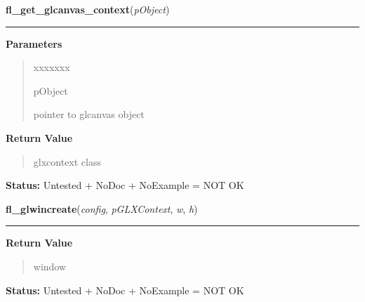\hspace{.8\funcindent}\begin{boxedminipage}{\funcwidth}

    \raggedright \textbf{fl\_get\_glcanvas\_context}(\textit{pObject})

    \vspace{-1.5ex}

    \rule{\textwidth}{0.5\fboxrule}
\setlength{\parskip}{2ex}
\setlength{\parskip}{1ex}
      \textbf{Parameters}
      \vspace{-1ex}

      \begin{quote}
        \begin{Ventry}{xxxxxxx}

          \item[pObject]

          pointer to glcanvas object

        \end{Ventry}

      \end{quote}

      \textbf{Return Value}
    \vspace{-1ex}

      \begin{quote}
      glxcontext class

      \end{quote}

\textbf{Status:} Untested + NoDoc + NoExample = NOT OK



    \end{boxedminipage}

    \label{xformslib:library:fl_glwincreate}

    \vspace{0.5ex}

\hspace{.8\funcindent}\begin{boxedminipage}{\funcwidth}

    \raggedright \textbf{fl\_glwincreate}(\textit{config}, \textit{pGLXContext}, \textit{w}, \textit{h})

    \vspace{-1.5ex}

    \rule{\textwidth}{0.5\fboxrule}
\setlength{\parskip}{2ex}
\setlength{\parskip}{1ex}
      \textbf{Return Value}
    \vspace{-1ex}

      \begin{quote}
      window

      \end{quote}

\textbf{Status:} Untested + NoDoc + NoExample = NOT OK



    \end{boxedminipage}


